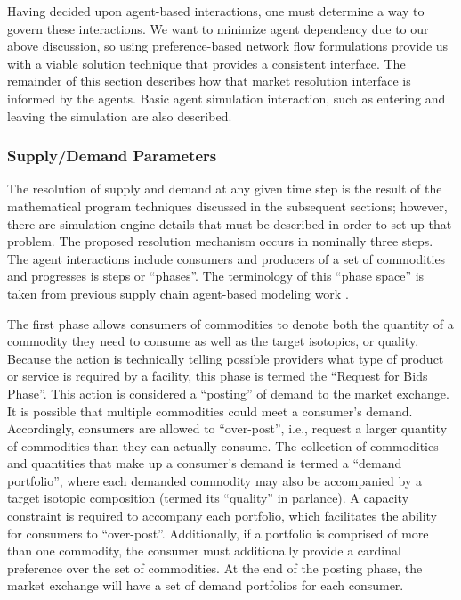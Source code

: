 Having decided upon agent-based interactions, one must determine a way to govern
these interactions. We want to minimize agent dependency due to our above
discussion, so using preference-based network flow formulations provide us with
a viable solution technique that provides a consistent interface. The remainder
of this section describes how that market resolution interface is informed by
the agents. Basic agent simulation interaction, such as entering and leaving the
simulation are also described.

\subsubsection{Supply/Demand Parameters}

The resolution of supply and demand at any given time step is the result of the
mathematical program techniques discussed in the subsequent sections; however,
there are simulation-engine details that must be described in order to set up
that problem. The proposed resolution mechanism occurs in nominally three
steps. The agent interactions include consumers and producers of a set of
commodities and progresses is steps or ``phases''. The terminology of this
``phase space'' is taken from previous supply chain agent-based modeling
work \cite{julka_agent-based_2002}.

The first phase allows consumers of commodities to denote both the quantity of a
commodity they need to consume as well as the target isotopics, or
quality. Because the action is technically telling possible providers what type
of product or service is required by a facility, this phase is termed the
``Request for Bids Phase''. This action is considered a ``posting'' of demand to
the market exchange. It is possible that multiple commodities could meet a
consumer's demand. Accordingly, consumers are allowed to ``over-post'', i.e.,
request a larger quantity of commodities than they can actually consume. The
collection of commodities and quantities that make up a consumer's demand is
termed a ``demand portfolio'', where each demanded commodity may also be
accompanied by a target isotopic composition (termed its ``quality'' in \Cyclus
parlance). A capacity constraint is required to accompany each portfolio, which
facilitates the ability for consumers to ``over-post''. Additionally, if a
portfolio is comprised of more than one commodity, the consumer must
additionally provide a cardinal preference over the set of commodities. At the
end of the posting phase, the market exchange will have a set of demand
portfolios for each consumer.

